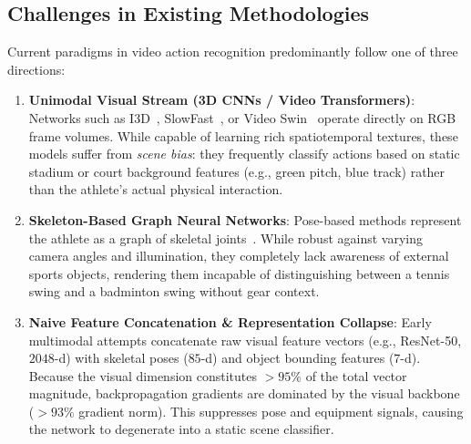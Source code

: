 \documentclass[10pt,journal,compsoc]{IEEEtran}
\begin{document}
\subsection{Challenges in Existing Methodologies}
Current paradigms in video action recognition predominantly follow one of three directions:
\begin{enumerate}
    \item \textbf{Unimodal Visual Stream (3D CNNs / Video Transformers)}: Networks such as I3D~\cite{carreira2017quo}, SlowFast~\cite{feichtenhofer2019slowfast}, or Video Swin~\cite{liu2022video} operate directly on RGB frame volumes. While capable of learning rich spatiotemporal textures, these models suffer from \textit{scene bias}: they frequently classify actions based on static stadium or court background features (e.g., green pitch, blue track) rather than the athlete's actual physical interaction.
    \item \textbf{Skeleton-Based Graph Neural Networks}: Pose-based methods represent the athlete as a graph of skeletal joints~\cite{yan2018spatial}. While robust against varying camera angles and illumination, they completely lack awareness of external sports objects, rendering them incapable of distinguishing between a tennis swing and a badminton swing without gear context.
    \item \textbf{Naive Feature Concatenation \& Representation Collapse}: Early multimodal attempts concatenate raw visual feature vectors (e.g., ResNet-50, $2048$-d) with skeletal poses ($85$-d) and object bounding features ($7$-d). Because the visual dimension constitutes $>95\%$ of the total vector magnitude, backpropagation gradients are dominated by the visual backbone ($>93\%$ gradient norm). This suppresses pose and equipment signals, causing the network to degenerate into a static scene classifier.
\end{enumerate}
\end{document}
